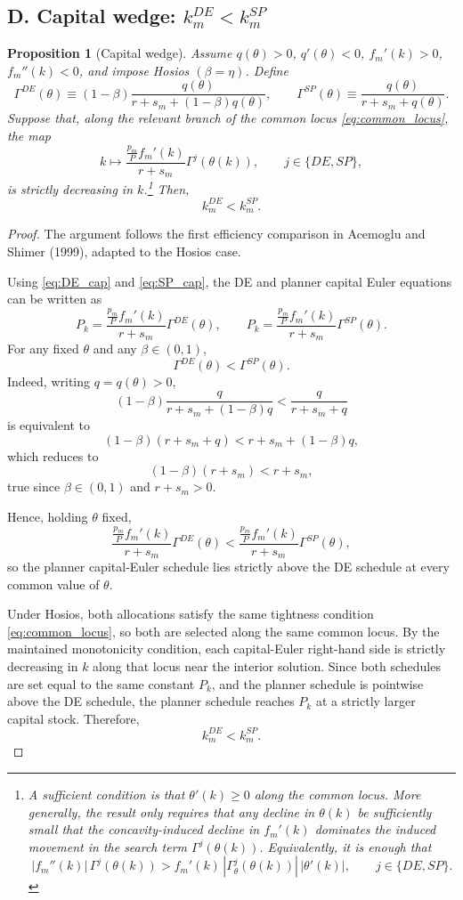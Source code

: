 \documentclass[12pt]{article}
\newtheorem{proposition}{Proposition}
\begin{document}

\subsection*{D. Capital wedge: $k_m^{DE}<k_m^{SP}$}

\begin{proposition}[Capital wedge]\label{prop:kwedge}
Assume $q(\theta)>0$, $q'(\theta)<0$, $f_m'(k)>0$, $f_m''(k)<0$, and impose Hosios $(\beta=\eta)$.
Define
\[
\Gamma^{DE}(\theta)\equiv (1-\beta)\frac{q(\theta)}{r+s_m+(1-\beta)q(\theta)},
\qquad
\Gamma^{SP}(\theta)\equiv \frac{q(\theta)}{r+s_m+q(\theta)}.
\]
Suppose that, along the relevant branch of the common locus \eqref{eq:common_locus}, the map
\[
k\mapsto \frac{\frac{p_m}{P}f_m'(k)}{r+s_m}\Gamma^j(\theta(k)),
\qquad j\in\{DE,SP\},
\]
is strictly decreasing in $k$.\footnote{A sufficient condition is that $\theta'(k)\ge 0$ along the common locus. More generally, the result only requires that any decline in $\theta(k)$ be sufficiently small that the concavity-induced decline in $f_m'(k)$ dominates the induced movement in the search term $\Gamma^j(\theta(k))$. Equivalently, it is enough that
\[
|f_m''(k)|\,\Gamma^j(\theta(k))
>
f_m'(k)\,|\Gamma_\theta^j(\theta(k))|\,|\theta'(k)|,
\qquad j\in\{DE,SP\}.
\]}
Then,
\[
k_m^{DE}<k_m^{SP}.
\]
\end{proposition}

\begin{proof}
The argument follows the first efficiency comparison in Acemoglu and Shimer (1999), adapted to the Hosios case.

Using \eqref{eq:DE_cap} and \eqref{eq:SP_cap}, the DE and planner capital Euler equations can be written as
\[
P_k=\frac{\frac{p_m}{P}f_m'(k)}{r+s_m}\Gamma^{DE}(\theta),
\qquad
P_k=\frac{\frac{p_m}{P}f_m'(k)}{r+s_m}\Gamma^{SP}(\theta).
\]
For any fixed $\theta$ and any $\beta\in(0,1)$,
\[
\Gamma^{DE}(\theta)<\Gamma^{SP}(\theta).
\]
Indeed, writing $q=q(\theta)>0$,
\[
(1-\beta)\frac{q}{r+s_m+(1-\beta)q}
<
\frac{q}{r+s_m+q}
\]
is equivalent to
\[
(1-\beta)(r+s_m+q)<r+s_m+(1-\beta)q,
\]
which reduces to
\[
(1-\beta)(r+s_m)<r+s_m,
\]
true since $\beta\in(0,1)$ and $r+s_m>0$.

Hence, holding $\theta$ fixed,
\[
\frac{\frac{p_m}{P}f_m'(k)}{r+s_m}\Gamma^{DE}(\theta)
<
\frac{\frac{p_m}{P}f_m'(k)}{r+s_m}\Gamma^{SP}(\theta),
\]
so the planner capital-Euler schedule lies strictly above the DE schedule at every common value of $\theta$.

Under Hosios, both allocations satisfy the same tightness condition \eqref{eq:common_locus}, so both are selected along the same common locus. By the maintained monotonicity condition, each capital-Euler right-hand side is strictly decreasing in $k$ along that locus near the interior solution. Since both schedules are set equal to the same constant $P_k$, and the planner schedule is pointwise above the DE schedule, the planner schedule reaches $P_k$ at a strictly larger capital stock. Therefore,
\[
k_m^{DE}<k_m^{SP}.
\]
\end{proof}
\end{document}
